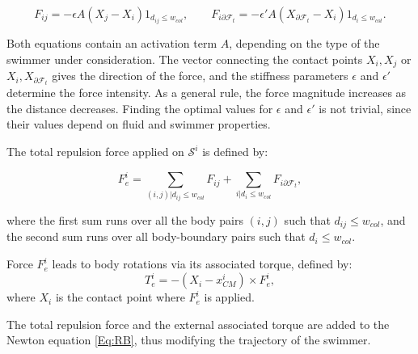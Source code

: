 \documentclass[graybox]{svmult}
\newcommand{\Fluid}{\mathcal{F}} %
\newcommand{\Solid}{\mathcal{S}} %
\begin{document}


$$
F_{ij} = - \epsilon A  ( X_j - X_i)  1_{d_{ij} \leq w_{col}}, \qquad
F_{i \partial \Fluid_t} = - \epsilon' A ( X_{\partial \Fluid_t} - X_i )  1_{d_{i} \leq w_{col}}.
$$

Both equations contain an activation term $A$, depending on the type of the swimmer under consideration.  The vector connecting the contact points $X_i, X_j$ or $X_i, X_{\partial \Fluid_t}$
gives the direction of the force, and the stiffness parameters $\epsilon$ and $\epsilon'$ determine the force intensity. As a general rule, the force magnitude increases as the distance decreases. Finding the optimal values for $\epsilon$ and $\epsilon'$ is not trivial, since their values depend on fluid and swimmer properties.   

The total repulsion force applied on $\Solid^i$ is defined by:



$$
F_e^i = \sum_{(i,j)|d_{ij} \leq w_{col}} F_{ij} +  \sum_{i | d_i \leq w_{col}} F_{i \partial \Fluid_t},
$$

where the first sum runs over all the body pairs $(i,j)$ such that $d_{ij}\le w_{col}$, and the second sum runs over all body-boundary pairs such that $d_{i}\le w_{col}$.

Force $F_e^i$ leads to body rotations via its associated torque, defined by: 
$$
T_e^i = - (X_i - x_{CM}^i )\times F_e^i,
$$
where  $X_i$ is the contact point where $F_e^i$ is applied.

The total repulsion force and the external associated torque are added to the Newton equation \eqref{Eq:RB}, thus modifying the trajectory of the swimmer.  

\end{document}

